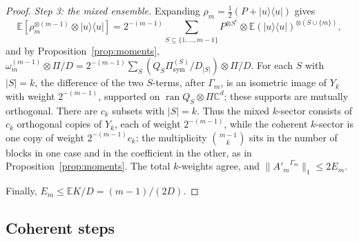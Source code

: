 \documentclass[pdflatex,sn-mathphys-num]{sn-jnl}%
\theoremstyle{thmstyleone}
\theoremstyle{thmstylethree}
\theoremstyle{thmstyletwo}
\newcommand{\ran}{\operatorname{ran}}
\newcommand{\E}{\mathbb{E}}
\newcommand{\ket}[1]{|#1\rangle}
\newcommand{\bra}[1]{\langle #1|}
\newcommand{\sym}{\mathrm{sym}}
\newcommand{\C}{\mathbb{C}}
\begin{document}
\begin{proof}
\emph{Step 3: the mixed ensemble.} Expanding $\rho_m=\tfrac12(P+\ket u\bra u)$ gives
\[
\E[\rho_m^{\otimes(m-1)}\otimes\ket u\bra u]=2^{-(m-1)}\sum_{S\subseteq\{1,\dots,m-1\}}P^{\otimes
S^c}\otimes\E(\ket u\bra u)^{\otimes(S\cup\{m\})},
\]
and by Proposition~\ref{prop:moments}, $\omega_m^{(m-1)}\otimes\Pi/D=2^{-(m-1)}\sum_S(Q_S\Pi^{(S)}_\sym/D_{|S|})\otimes
\Pi/D$. For each $S$ with $|S|=k$, the difference of the two $S$-terms, after $\Gamma_m$, is an isometric image of $Y_k$
with weight $2^{-(m-1)}$, supported on $\ran Q_S\otimes\Pi\C^d$; these supports are mutually orthogonal. There are
$c_k$ subsets with $|S|=k$. Thus the mixed $k$-sector consists of $c_k$ orthogonal copies of $Y_k$, each of weight
$2^{-(m-1)}$, while the coherent $k$-sector is one copy of weight $2^{-(m-1)}c_k$: the multiplicity $\binom{m-1}k$ sits
in the number of blocks in one case and in the coefficient in the other, as in Proposition~\ref{prop:moments}. The total
$k$-weights agree, and $\|{A'_m}^{\Gamma_m}\|_1\le2E_m$.

Finally, $E_m\le\E K/D=(m-1)/(2D)$.
\end{proof}

\subsection{Coherent steps}
\end{document}
